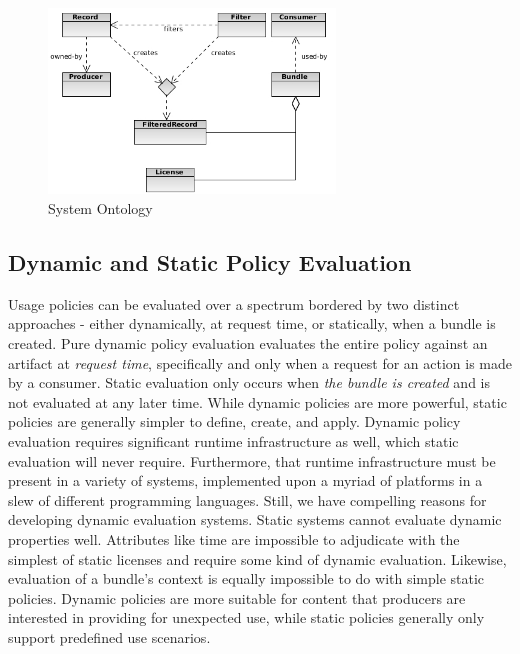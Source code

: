 \documentclass[10pt, conference, compsocconf]{IEEEtran}
\begin{document}
\begin{figure}[!t]
\centering
\includegraphics[width=3in]{ontology}
\caption{System Ontology}
\label{System Ontology}
\end{figure}

\subsection{Dynamic and Static Policy Evaluation}
Usage policies can be evaluated over a spectrum bordered by two distinct approaches - either dynamically, at request time, or statically, when a bundle is created.  Pure dynamic policy evaluation evaluates the entire policy against an artifact at \textit{request time}, specifically and only when a request for an action is made by a consumer.  Static evaluation only occurs when \textit{the bundle is created} and is not evaluated at any later time.  While dynamic policies are more powerful, static policies are generally simpler to define, create, and apply.  Dynamic policy evaluation requires significant runtime infrastructure as well, which static evaluation will never require.  Furthermore, that runtime infrastructure must be present in a variety of systems, implemented upon a myriad of platforms in a slew of different programming languages.  Still, we have compelling reasons for developing dynamic evaluation systems.  Static systems cannot evaluate dynamic properties well.  Attributes like time are impossible to adjudicate with the simplest of static licenses and require some kind of dynamic evaluation.  Likewise, evaluation of a bundle's context is equally impossible to do with simple static policies.  Dynamic policies are more suitable for content that producers are interested in providing for unexpected use, while static policies generally only support predefined use scenarios.
\end{document}
